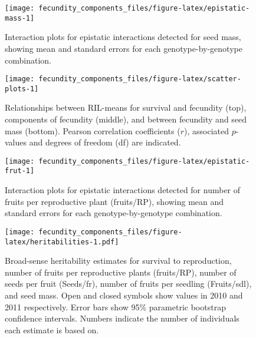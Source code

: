 \documentclass[]{article}
\begin{document}
\newpage

\begin{figure}

{\centering \texttt{[image: fecundity\_components\_files/figure-latex/epistatic-mass-1]} 

}

\caption[Epistatic interactions for seed mass]{Interaction plots for epistatic interactions detected for seed mass, showing mean and standard errors for each genotype-by-genotype combination.}\label{fig:epistatic-mass}
\end{figure}

\newpage

\begin{figure}

{\centering \texttt{[image: fecundity\_components\_files/figure-latex/scatter-plots-1]} 

}

\caption[Scatter plots between RIL-means for survival and fecundity, components of fecundity, and between overall fecundity and seed mass]{Relationships between RIL-means for survival and fecundity (top), components of fecundity (middle), and between fecundity and seed mass (bottom). Pearson correlation coefficients ($r$), associated $p$-values and degrees of freedom (df) are indicated.}\label{fig:scatter-plots}
\end{figure}

\newpage

\begin{figure}

{\centering \texttt{[image: fecundity\_components\_files/figure-latex/epistatic-frut-1]} 

}

\caption[Epistatic interactions for number of fruits per reproductive plant]{Interaction plots for epistatic interactions detected for number of fruits per reproductive plant (fruits/RP), showing mean and standard errors for each genotype-by-genotype combination.}\label{fig:epistatic-frut}
\end{figure}

\newpage

\begin{figure}
\centering
\texttt{[image: fecundity\_components\_files/figure-latex/heritabilities-1.pdf]}
\caption{\label{fig:heritabilities}Broad-sense heritability estimates for survival to reproduction, number of fruits per reproductive plants (fruits/RP), number of seeds per fruit (Seeds/fr), number of fruits per seedling (Fruits/sdl), and seed mass. Open and closed symbols show values in 2010 and 2011 respectively. Error bars show 95\% parametric bootstrap confidence intervals. Numbers indicate the number of individuals each estimate is based on.}
\end{figure}
\end{document}
